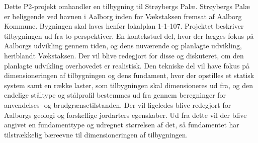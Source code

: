 Dette P2-projekt omhandler en tilbygning til Strøybergs Palæ.
\newline
\newline
Strøybergs Palæ er beliggende ved havnen i Aalborg inden for Vækstaksen fremsat af Aalborg Kommune. Bygningen skal laves henfør lokalplan 1-1-107. Projektet beskriver tilbygningen ud fra to perspektiver. En kontekstuel del, hvor der lægges fokus på Aalborgs udvikling gennem tiden, og dens nuværende og planlagte udvikling, heriblandt Vækstaksen. Der vil blive redegjort for disse og diskuteret, om den planlagte udvikling overhovedet er realistisk. Den tekniske del vil have fokus på dimensioneringen af tilbygningen og dens fundament, hvor der opstilles et statisk system samt en række laster, som tilbygningen skal dimensioneres ud fra, og den endelige ståltype og stålprofil bestemmes ud fra gennem beregninger for anvendelses- og brudgrænsetilstanden. Der vil ligeledes blive redegjort for Aalborgs geologi og forskellige jordarters egenskaber. Ud fra dette vil der blive angivet en fundamenttype og udregnet størrelsen af det, så fundamentet har tilstrækkelig bæreevne til dimensioneringen af tilbygningen.
